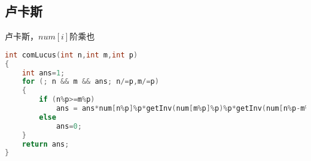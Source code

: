 \subsection{卢卡斯}
	卢卡斯，$num[i]$阶乘也
	\begin{lstlisting}[language=c++]
int comLucus(int n,int m,int p)
{
	int ans=1;
	for (; n && m && ans; n/=p,m/=p)
	{
		if (n%p>=m%p)
			ans = ans*num[n%p]%p*getInv(num[m%p]%p)%p*getInv(num[n%p-m%p])%p;
		else
			ans=0;
	}
	return ans;
}
	\end{lstlisting}
